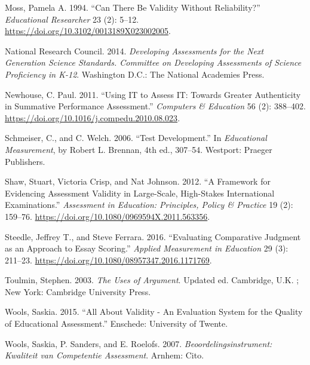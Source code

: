 \documentclass[
  letterpaper,
]{report}
\newlength{\cslhangindent}
\newlength{\cslentryspacingunit} %
\newenvironment{CSLReferences}[2] %
 {%
  \setlength{\parindent}{0pt}
  \ifodd #1
  \let\oldpar\par
  \def\par{\hangindent=\cslhangindent\oldpar}
  \fi
  \setlength{\parskip}{#2\cslentryspacingunit}
 }%
 {}
\begin{document}
\begin{CSLReferences}{1}{0}
\leavevmode{}%
Moss, Pamela A. 1994. {``Can {There Be Validity Without Reliability}?''}
\emph{Educational Researcher} 23 (2): 5--12.
\url{https://doi.org/10.3102/0013189X023002005}.

\leavevmode{}%
National Research Council. 2014. \emph{Developing {Assessments} for the
{Next Generation Science Standards}. {Committee} on {Developing
Assessments} of {Science Proficiency} in {K-12}}. {Washington D.C.}:
{The National Academies Press}.

\leavevmode{}%
Newhouse, C. Paul. 2011. {``Using {IT} to Assess {IT}: {Towards} Greater
Authenticity in Summative Performance Assessment.''} \emph{Computers \&
Education} 56 (2): 388--402.
\url{https://doi.org/10.1016/j.compedu.2010.08.023}.

\leavevmode{}%
Schmeiser, C., and C. Welch. 2006. {``Test {Development}.''} In
\emph{Educational {Measurement}}, by Robert L. Brennan, 4th ed.,
307--54. {Westport}: {Praeger Publishers}.

\leavevmode{}%
Shaw, Stuart, Victoria Crisp, and Nat Johnson. 2012. {``A Framework for
Evidencing Assessment Validity in Large-Scale, High-Stakes International
Examinations.''} \emph{Assessment in Education: Principles, Policy \&
Practice} 19 (2): 159--76.
\url{https://doi.org/10.1080/0969594X.2011.563356}.

\leavevmode{}%
Steedle, Jeffrey T., and Steve Ferrara. 2016. {``Evaluating {Comparative
Judgment} as an {Approach} to {Essay Scoring}.''} \emph{Applied
Measurement in Education} 29 (3): 211--23.
\url{https://doi.org/10.1080/08957347.2016.1171769}.

\leavevmode{}%
Toulmin, Stephen. 2003. \emph{The Uses of Argument}. Updated ed.
{Cambridge, U.K. ; New York}: {Cambridge University Press}.

\leavevmode{}%
Wools, Saskia. 2015. {``All {About Validity} - {An} Evaluation System
for the Quality of Educational Assessment.''} {Enschede}: {University of
Twente}.

\leavevmode{}%
Wools, Saskia, P. Sanders, and E. Roelofs. 2007.
\emph{Beoordelingsinstrument: Kwaliteit van Competentie Assessment}.
Arnhem: Cito.

\end{CSLReferences}
\end{document}
